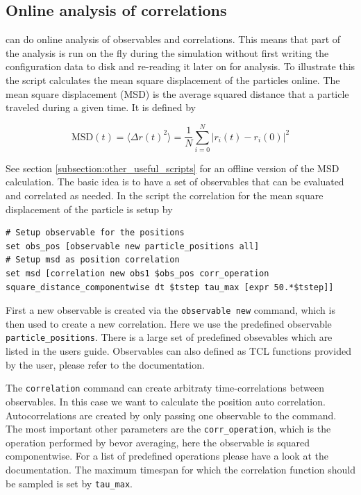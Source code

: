 \documentclass[
paper=a4,                       %
fontsize=11pt,                  %
twoside,                        %
footsepline,                    %
headsepline,                    %
headinclude=false,              %
footinclude=false,              %
pagesize,                       %
]{scrartcl}
\begin{document}
\subsection{Online analysis of correlations}
\label{subsection:online_analysis}
\es{} can do online analysis of observables and correlations. This means that part of the analysis
is run on the fly during the simulation without first writing the configuration data to disk and re-reading it later on for analysis.
 To illustrate this the script calculates the mean square displacement of the particles online. 
The mean square displacement (MSD) is the average squared distance that a particle traveled during a given time.
It is defined by

$$
\text{MSD}(t) = \langle \Delta r(t) ^{2} \rangle = \frac {1} {N} \sum_{i=0}^{N} | r_{i}(t)-r_{i}(0) | ^{2}
$$

See section \ref{subsection:other_useful_scripts} for an offline version of the MSD calculation. The basic idea is to have a set of observables
that can be evaluated and correlated as needed. In the script the correlation for the mean square displacement of the particle is setup by

{\small\vspace{0,2cm}
\begin{lstlisting}[numbers=none]
# Setup observable for the positions
set obs_pos [observable new particle_positions all]
# Setup msd as position correlation
set msd [correlation new obs1 $obs_pos corr_operation square_distance_componentwise dt $tstep tau_max [expr 50.*$tstep]]
\end{lstlisting}\vspace{0,2cm}
} 

First a new observable is created via the \texttt{observable new} command, which is then used to create a new correlation. Here we use the predefined observable \texttt{particle\_positions}. There is a large set of predefined obsevables which are listed in the users guide. Observables can also defined as TCL functions provided by the user, please refer to the documentation.
 
The \texttt{correlation} command can create arbitraty time-correlations between observables. In this case
we want to calculate the position auto correlation. Autocorrelations are created by only passing one observable to the command. The most important other parameters are the \texttt{corr\_operation}, which is the operation performed by bevor averaging, here the observable is squared componentwise. For a list of predefined operations please have a look at the documentation. The maximum timespan for which the correlation function should be sampled is set by \texttt{tau\_max}.
\end{document}
